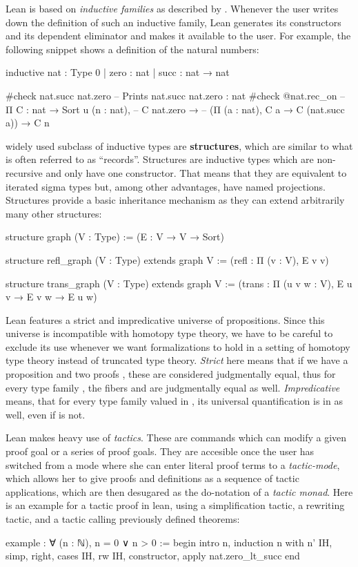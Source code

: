Lean is based on \emph{inductive families} as described by \citet{dybjer94}.
Whenever the user writes down the definition of such an inductive family,
Lean generates its constructors and its dependent eliminator and makes
it available to the user.
For example, the following snippet shows a definition of the natural numbers:
\begin{leancodebr}
inductive nat : Type 0
| zero : nat
| succ : nat → nat

#check nat.succ nat.zero -- Prints nat.succ nat.zero : nat
#check @nat.rec_on -- Π {C : nat → Sort u} (n : nat),
                   --   C nat.zero →
                   --   (Π (a : nat), C a → C (nat.succ a)) → C n
\end{leancodebr}

 widely used subclass of inductive types are \textbf{structures}, which are
similar to what is often referred to as ``records''.
Structures are inductive types which are non-recursive and only have one constructor.
That means that they are equivalent to iterated sigma types but, among other advantages,
have named projections.
Structures provide a basic inheritance mechanism as they can extend arbitrarily
many other structures:
\begin{leancode}
structure graph (V : Type) :=
  (E : V → V → Sort)

structure refl_graph (V : Type) extends graph V :=
  (refl : Π (v : V), E v v)

structure trans_graph (V : Type) extends graph V :=
  (trans : Π (u v w : V), E u v → E v w → E u w)
\end{leancode}

Lean features a strict and impredicative universe  of propositions.
Since this universe is incompatible with homotopy type theory, we have to be
careful to exclude its use whenever we want formalizations to hold in
a setting of homotopy type theory instead of truncated type theory.
\emph{Strict} here means that if we have a proposition  and two
proofs , these are considered judgmentally equal, thus for
every type family , the fibers  and 
are judgmentally equal as well.
\emph{Impredicative} means, that for every type family valued in ,
its universal quantification  is in  as well, even
if  is not.

Lean makes heavy use of \emph{tactics}.
These are commands which can modify a given proof goal or a series of proof
goals.
They are accesible once the user has switched from a mode where she can
enter literal proof terms to a \emph{tactic-mode},
which allows her to give proofs and definitions as a sequence of tactic applications,
which are then desugared as the do-notation of a \emph{tactic monad}.
Here is an example for a tactic proof in lean, using a simplification tactic,
a rewriting tactic, and a tactic calling previously defined theorems:
\begin{leancodebr}
example : ∀ (n : ℕ), n = 0 ∨ n > 0 :=
begin
  intro n,
  induction n with n' IH,
  simp,
  right,
  cases IH,
  rw IH, constructor,
  apply nat.zero_lt_succ
end
\end{leancodebr}

